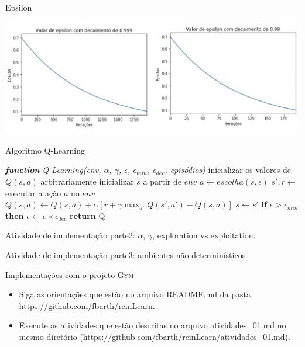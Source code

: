 \documentclass{beamer}
\begin{document}
\begin{frame}{Epsilon}
	  \begin{center}
		\includegraphics[width=\textwidth]{figuras/epsilon.png}
	\end{center}
\end{frame}

\begin{frame}{Algoritmo Q-Learning}
	
\begin{algorithmic} 
	\STATE \emph{\textbf{function} Q-Learning(env, $\alpha$, $\gamma$, $\epsilon$, $\epsilon_{min}$, $\epsilon_{dec}$, episódios)}
	\STATE inicializar os valores de $Q(s, a)$ arbitrariamente
	\STATE inicializar $s$ a partir de $env$
	\REPEAT
	\STATE $a \leftarrow escolha(s, \epsilon)$
	\STATE $s', r \leftarrow$ executar a ação $a$ no $env$
	\STATE $Q(s,a) \leftarrow Q(s,a) + \alpha [r +\gamma \max_{a'}{Q(s', a')} - Q(s,a)]$
	\STATE$s  \leftarrow s'$
	\STATE \textbf{if} $\epsilon > \epsilon_{min}$ \textbf{then} $\epsilon \leftarrow \epsilon \times \epsilon_{dec}$
	\ENDFOR
	\STATE \textbf{return} Q
\end{algorithmic}	
\end{frame}

\begin{frame}{Atividade de implementação}
	parte2: $\alpha$, $\gamma$, exploration vs exploitation.
\end{frame}

\begin{frame}{Atividade de implementação}
	parte3: ambientes não-determinísticos
\end{frame}



\begin{frame}{Implementações com o projeto \textsc{Gym}}
	\begin{itemize}
		\item Siga as orientações que estão no arquivo README.md da 
		pasta https://github.com/fbarth/reinLearn.
		
		\item Execute as atividades que estão descritas no arquivo atividades\_01.md no 
		mesmo diretório (https://github.com/fbarth/reinLearn/atividades\_01.md). 
	\end{itemize}
\end{frame}
\end{document}
